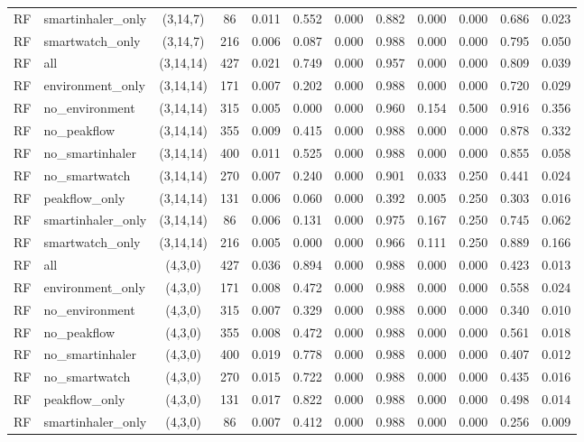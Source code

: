 \begin{longtable}{llcccccccccc}
RF & smartinhaler\_only & (3,14,7) & 86 & 0.011 & 0.552 & 0.000 & 0.882 & 0.000 & 0.000 & 0.686 & 0.023 \\
RF & smartwatch\_only & (3,14,7) & 216 & 0.006 & 0.087 & 0.000 & 0.988 & 0.000 & 0.000 & 0.795 & 0.050 \\
RF & all & (3,14,14) & 427 & 0.021 & 0.749 & 0.000 & 0.957 & 0.000 & 0.000 & 0.809 & 0.039 \\
RF & environment\_only & (3,14,14) & 171 & 0.007 & 0.202 & 0.000 & 0.988 & 0.000 & 0.000 & 0.720 & 0.029 \\
RF & no\_environment & (3,14,14) & 315 & 0.005 & 0.000 & 0.000 & 0.960 & 0.154 & 0.500 & 0.916 & 0.356 \\
RF & no\_peakflow & (3,14,14) & 355 & 0.009 & 0.415 & 0.000 & 0.988 & 0.000 & 0.000 & 0.878 & 0.332 \\
RF & no\_smartinhaler & (3,14,14) & 400 & 0.011 & 0.525 & 0.000 & 0.988 & 0.000 & 0.000 & 0.855 & 0.058 \\
RF & no\_smartwatch & (3,14,14) & 270 & 0.007 & 0.240 & 0.000 & 0.901 & 0.033 & 0.250 & 0.441 & 0.024 \\
RF & peakflow\_only & (3,14,14) & 131 & 0.006 & 0.060 & 0.000 & 0.392 & 0.005 & 0.250 & 0.303 & 0.016 \\
RF & smartinhaler\_only & (3,14,14) & 86 & 0.006 & 0.131 & 0.000 & 0.975 & 0.167 & 0.250 & 0.745 & 0.062 \\
RF & smartwatch\_only & (3,14,14) & 216 & 0.005 & 0.000 & 0.000 & 0.966 & 0.111 & 0.250 & 0.889 & 0.166 \\
RF & all & (4,3,0) & 427 & 0.036 & 0.894 & 0.000 & 0.988 & 0.000 & 0.000 & 0.423 & 0.013 \\
RF & environment\_only & (4,3,0) & 171 & 0.008 & 0.472 & 0.000 & 0.988 & 0.000 & 0.000 & 0.558 & 0.024 \\
RF & no\_environment & (4,3,0) & 315 & 0.007 & 0.329 & 0.000 & 0.988 & 0.000 & 0.000 & 0.340 & 0.010 \\
RF & no\_peakflow & (4,3,0) & 355 & 0.008 & 0.472 & 0.000 & 0.988 & 0.000 & 0.000 & 0.561 & 0.018 \\
RF & no\_smartinhaler & (4,3,0) & 400 & 0.019 & 0.778 & 0.000 & 0.988 & 0.000 & 0.000 & 0.407 & 0.012 \\
RF & no\_smartwatch & (4,3,0) & 270 & 0.015 & 0.722 & 0.000 & 0.988 & 0.000 & 0.000 & 0.435 & 0.016 \\
RF & peakflow\_only & (4,3,0) & 131 & 0.017 & 0.822 & 0.000 & 0.988 & 0.000 & 0.000 & 0.498 & 0.014 \\
RF & smartinhaler\_only & (4,3,0) & 86 & 0.007 & 0.412 & 0.000 & 0.988 & 0.000 & 0.000 & 0.256 & 0.009 \\

\end{longtable}
